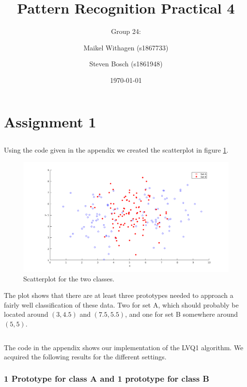 \documentclass[10pt]{article}
\title{Pattern Recognition Practical 4}
\author{Group 24: \and Maikel Withagen (s1867733) \and Steven Bosch (s1861948)}
\date{\today}
\begin{document}
\section{Assignment 1}
\subsection{}
Using the code given in the appendix we created the scatterplot in figure \ref{fig1.1}.

\begin{figure}[H]
 \centering
 \includegraphics[width=\textwidth]{Fig1_1.png}
 \caption{Scatterplot for the two classes.}
 \label{fig1.1}
\end{figure}

The plot shows that there are at least three prototypes needed to approach a fairly well classification of these data. Two for set A, which should probably be located around $(3,4.5)$ and $(7.5, 5.5)$, and one for set B somewhere around $(5,5)$. 

\subsection{}
The code in the appendix shows our implementation of the LVQ1 algorithm. We acquired the following results for the different settings.

\subsubsection{1 Prototype for class A and 1 prototype for class B}
\end{document}
